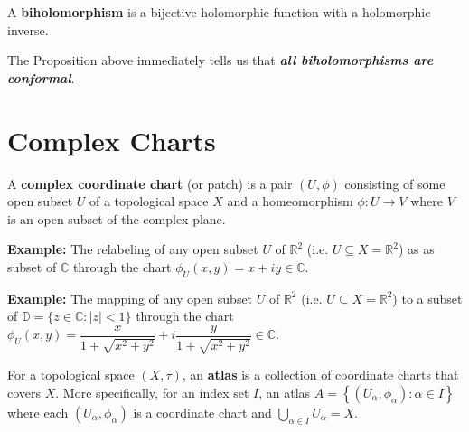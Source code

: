 \begin{definition} A \textbf{\textcolor{myblue}{biholomorphism}} is a bijective holomorphic function with a holomorphic inverse.   
\end{definition}


\noindent The Proposition above immediately tells us that \textit{\textbf{all biholomorphisms are conformal}}.

\section{Complex Charts}
\begin{definition}[] A \textbf{\textcolor{myblue}{complex coordinate chart}} (or patch) is a pair $(U,\phi)$ consisting of some open subset $U$ of a topological space $X$ and a homeomorphism $\phi:U\to V$ where $V$ is an open subset of the complex plane.\end{definition}

\noindent \textbf{Example: }
    The relabeling of any open subset $U$ of $\mathbb{R}^2$ (i.e. $U\subseteq X=\mathbb{R}^2$) as as subset of $\mathbb{C}$ through the chart $\phi_U(x,y)=x+iy\in\mathbb{C}$.

\noindent \textbf{Example: }
    The mapping of any open subset $U$ of $\mathbb{R}^2$ (i.e. $U\subseteq X=\mathbb{R}^2$) to a subset of $\mathbb{D}=\{z\in\mathbb{C}:|z|<1\}$ through the chart $\phi_U(x,y)=\dfrac{x}{1+\sqrt{x^2+y^2}}+i\dfrac{y}{1+\sqrt{x^2+y^2}}\in\mathbb{C}$. 



\begin{definition} For a topological space $(X,\tau)$, an  \textbf{\textcolor{myblue}{atlas}} is a collection of coordinate charts that covers $X$. More specifically, for an index set $I$, an atlas $A=\left\{\left(U_\alpha,\phi_\alpha\right):\alpha\in I\right\}$ where each $(U_\alpha,\phi_\alpha)$ is a coordinate chart and $\bigcup_{\alpha\in I}U_\alpha= X$.\end{definition}

